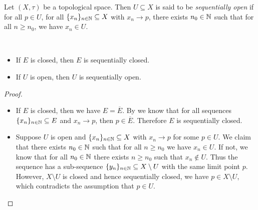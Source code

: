 \documentclass[screen]{techreport}
\numberwithin{equation}{section}
\begin{document}
\begin{definition}\label{De:SequentiallyOpen}
	Let $(X,\tau)$ be a topological space.
	Then $U \subseteq X$ is said to be \emph{sequentially open} if for all $p \in U$, for all $\{x_n\}_{n \in \mathbb{N}} \subseteq X$ with $x_n \rightarrow p$, there exists $n_0 \in \mathbb{N}$ such that for all $n \ge n_0$, we have $x_n \in U$.
\end{definition}

\begin{proposition}\label{Prop:ClosedOpenImplySeqClosedOpen}\
	\begin{itemize}
		\item If $E$ is closed, then $E$ is sequentially closed.
		\item If $U$ is open, then $U$ is sequentially open.
	\end{itemize}
\end{proposition}
\begin{proof}\
	\begin{itemize}
		\item If $E$ is closed, then we have $E = \overline{E}$.
		By  we know that for all sequences $\{x_n\}_{n \in \mathbb{N}} \subseteq E$ and $x_n \rightarrow p$, then $p \in \overline{E}$.
		Therefore $E$ is sequentially closed.
		
		\item Suppose $U$ is open and $\{x_n\}_{n \in \mathbb{N}} \subseteq X$ with $x_n \rightarrow p$ for some $p \in U$.
		We claim that there exists $n_0 \in \mathbb{N}$ such that for all $n \ge n_0$ we have $x_n \in U$.
		If not, we know that for all $n_0 \in \mathbb{N}$ there exists $n \ge n_0$ such that $x_n \not\in U$.
		Thus the sequence has a sub-sequence $\{y_n\}_{n \in \mathbb{N}} \subseteq X \setminus U$ with the same limit point $p$.
		However, $X \setminus U$ is closed and hence sequentially closed, we have $p \in X \setminus U$, which contradicts the assumption that $p \in U$.
	\end{itemize}
\end{proof}
\end{document}
